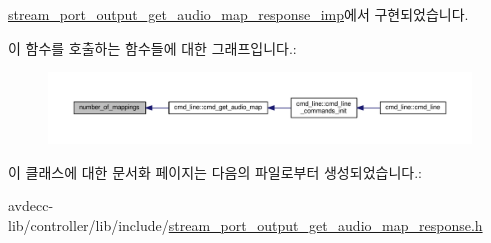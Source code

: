\hyperlink{classavdecc__lib_1_1stream__port__output__get__audio__map__response__imp_a3928eb3903b4e082cbc7d6d29146aabd}{stream\+\_\+port\+\_\+output\+\_\+get\+\_\+audio\+\_\+map\+\_\+response\+\_\+imp}에서 구현되었습니다.



이 함수를 호출하는 함수들에 대한 그래프입니다.\+:
\nopagebreak
\begin{figure}[H]
\begin{center}
\leavevmode
\includegraphics[width=350pt]{classavdecc__lib_1_1stream__port__output__get__audio__map__response_a7f2372b5389cf9ba04675f3ef37439f3_icgraph}
\end{center}
\end{figure}




이 클래스에 대한 문서화 페이지는 다음의 파일로부터 생성되었습니다.\+:\begin{DoxyCompactItemize}
\item 
avdecc-\/lib/controller/lib/include/\hyperlink{stream__port__output__get__audio__map__response_8h}{stream\+\_\+port\+\_\+output\+\_\+get\+\_\+audio\+\_\+map\+\_\+response.\+h}\end{DoxyCompactItemize}
